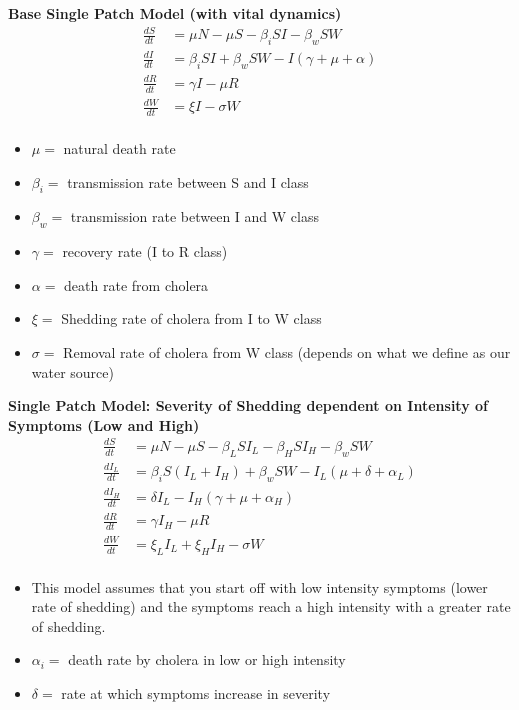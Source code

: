 \documentclass[]{article}
\begin{document}
	
	\textbf{Base Single Patch Model (with vital dynamics)}
	\begin{align*}
		\frac{dS}{dt}&= \mu N - \mu S - \beta_i SI - \beta_w S W  \\
		\frac{dI}{dt}&= \beta_i S I + \beta_w S W - I (\gamma + \mu + \alpha) \\
		\frac{dR}{dt}&= \gamma I - \mu R \\
		\frac{dW}{dt}&= \xi I  - \sigma W\\
	\end{align*}
	
	\begin{itemize}
		\item$\mu=$ natural death rate
		\item$\beta_i=$ transmission rate between S and I class
		\item$\beta_w=$ transmission rate between I and W class
		\item$\gamma=$ recovery rate (I to R class)
		\item$\alpha=$ death rate from cholera
		\item$\xi=$ Shedding rate of cholera from I to W class
		\item$\sigma=$	Removal rate of cholera from W class (depends on what we define as our water source)
	\end{itemize} 

\textbf{Single Patch Model: Severity of Shedding dependent on Intensity of Symptoms (Low and High)}
\begin{align*}
	\frac{dS}{dt}&= \mu N - \mu S - \beta_L S I_L - \beta_H S I_H - \beta_w S W  \\
	\frac{dI_L}{dt}&= \beta_i S( I_L + I_H) + \beta_w S W - I_L (\mu + \delta + \alpha_L) \\
	\frac{dI_H}{dt}&= \delta I_L - I_H (\gamma + \mu + \alpha_H) \\
	\frac{dR}{dt}&= \gamma I_H - \mu R \\
	\frac{dW}{dt}&= \xi_L I_L + \xi_H I_H  - \sigma W\\
	\end{align*}

\begin{itemize}
	\item This model assumes that you start off with low intensity symptoms (lower rate of shedding) and the symptoms reach a high intensity with a greater rate of shedding.
	\item$\alpha_i=$ death rate by cholera in low or high intensity 
	\item$\delta =$ rate at which symptoms increase in severity		
\end{itemize}
		
\end{document}
